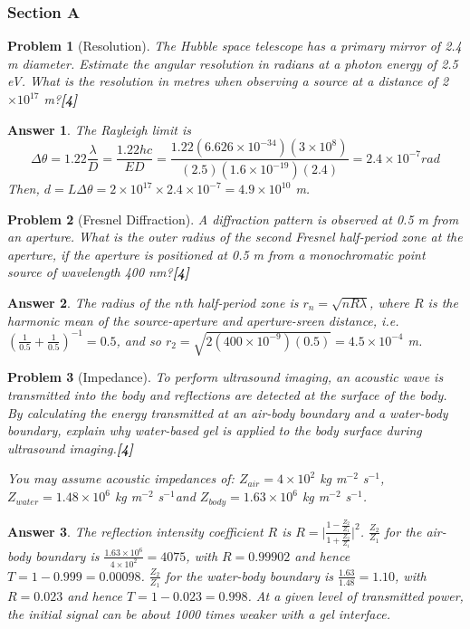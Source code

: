 \documentclass[a4paper]{article}
\newtheorem{ans}{Answer}[subsection]
\theoremstyle{new}
\newtheorem{qns}{Problem}[subsection]
\begin{document}
\subsubsection{Section A}
\begin{qns}[Resolution]
The Hubble space telescope has a primary mirror of 2.4 m diameter. Estimate the angular resolution in radians at a photon energy of 2.5 eV. What is the resolution in metres when observing a source at a distance of 2$\times10^{17}$ m?\hfill\textbf{[4]}
\end{qns}
\begin{ans}
The Rayleigh limit is $$\Delta\theta=1.22\frac{\lambda}{D}=\frac{1.22hc}{ED}=\frac{1.22(6.626\times10^{-34})(3\times10^8)}{(2.5)(1.6\times10^{-19})(2.4)}=2.4\times10^{-7}rad$$
Then, $d=L\Delta\theta=2\times10^{17}\times 2.4\times10^{-7}=4.9\times10^{10}$ m. 
\end{ans}
\begin{qns}[Fresnel Diffraction]
A diffraction pattern is observed at 0.5 m from an aperture. What is the outer radius of the second Fresnel half-period zone at the aperture, if the aperture is positioned at 0.5 m from a monochromatic point source of wavelength 400 nm?\hfill\textbf{[4]}
\end{qns}
\begin{ans}
The radius of the $n$th half-period zone is $r_n=\sqrt{nR\lambda}$, where $R$ is the harmonic mean of the source-aperture and aperture-sreen distance, i.e. $(\frac{1}{0.5}+\frac{1}{0.5})^{-1}=0.5$, and so $r_2=\sqrt{2(400\times10^{-9})(0.5)}=4.5\times10^{-4}$ m.
\end{ans}
\begin{qns}[Impedance]
To perform ultrasound imaging, an acoustic wave is transmitted into the body and reflections are detected at the surface of the body. By calculating the energy transmitted at an air-body boundary and a water-body boundary, explain why water-based gel is applied to the body surface during ultrasound imaging.\hfill\textbf{[4]}
\begin{mdframed}
You may assume acoustic impedances of: $Z_{air} = 4 \times10^2$ kg m$^{-2}$ s$^{-1}$, $Z_{water} = 1.48 \times10^6$ kg m$^{-2}$ s$^{-1}$and $Z_{body} = 1.63 \times 10^6$ kg m$^{-2}$ s$^{-1}$.
\end{mdframed}
\end{qns}
\begin{ans}
The reflection intensity coefficient $R$ is $ R=\bigg|\frac{1-\frac{Z_2}{Z_1}}{1+\frac{Z_2}{Z_1}}\bigg|^2$. $\frac{Z_2}{Z_1}$ for the air-body boundary is $\frac{1.63\times10^6}{4\times10^2}=4075$, with $R=0.99902$ and hence $T=1-0.999=0.00098$. $\frac{Z_2}{Z_1}$ for the water-body boundary is $\frac{1.63}{1.48}=1.10$, with $R=0.023$ and hence $T=1-0.023=0.998$. At a given level of transmitted power, the initial signal can be about 1000 times weaker with a gel interface.
\end{ans}
\end{document}
